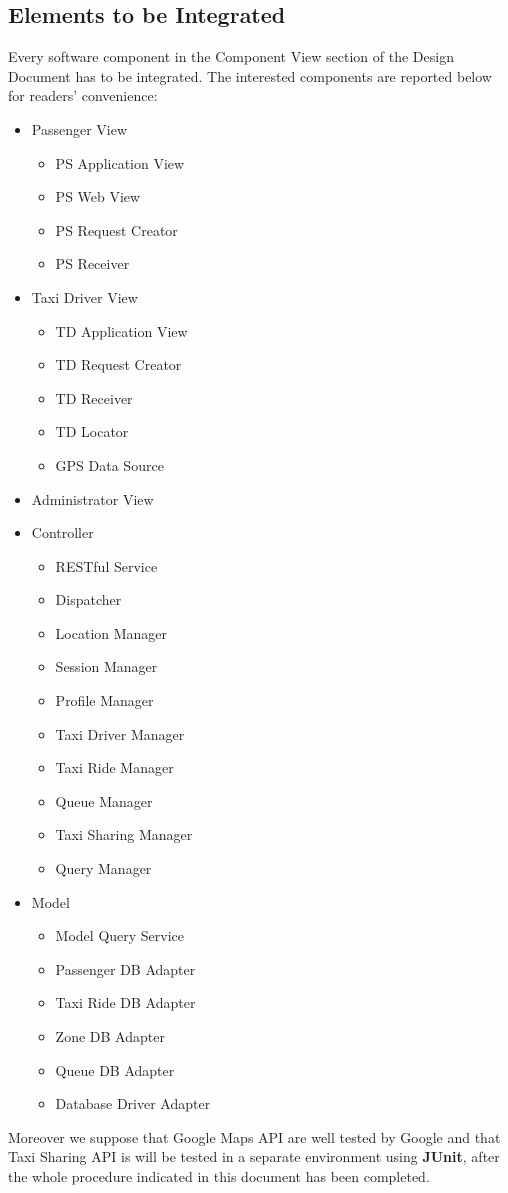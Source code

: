 \subsection{Elements to be Integrated}
Every software component in the Component View section of the Design Document has to be integrated.
The interested components are reported below for readers' convenience:
\begin{itemize}
	\item Passenger View
	\begin{itemize}
		\item PS Application View
		\item PS Web View
		\item PS Request Creator
		\item PS Receiver
	\end{itemize}
	\item Taxi Driver View
	\begin{itemize}
		\item TD Application View
		\item TD Request Creator
		\item TD Receiver
		\item TD Locator
		\item GPS Data Source
	\end{itemize}
	\item Administrator View
	\item Controller
	\begin{itemize}
		\item RESTful Service
		\item Dispatcher
		\item Location Manager
		\item Session Manager
		\item Profile Manager
		\item Taxi Driver Manager
		\item Taxi Ride Manager
		\item Queue Manager
		\item Taxi Sharing Manager
		\item Query Manager
	\end{itemize}
	\item Model
	\begin{itemize}
		\item Model Query Service
		\item Passenger DB Adapter
		\item Taxi Ride DB Adapter
		\item Zone DB Adapter
		\item Queue DB Adapter
		\item Database Driver Adapter
	\end{itemize}
\end{itemize}
Moreover we suppose that Google Maps API are well tested by Google and that \myTaxiService{} Taxi Sharing API is will be tested in a separate environment using \textbf{JUnit}, after the whole procedure indicated in this document has been completed.

